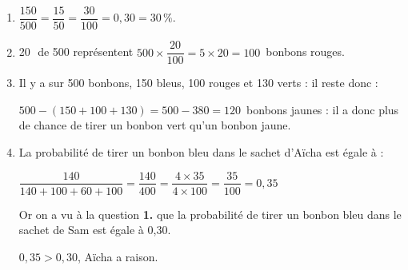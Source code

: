 
\medskip

%
%

\begin{enumerate}
\item %

$\dfrac{150}{500} =  \dfrac{15}{50} = \dfrac{30}{100} = 0,30 = 30\,\%$.
\item %
20\,\ de 500 représentent $500 \times \dfrac{20}{100} = 5 \times 20 = 100$~bonbons rouges.
\item %
Il y a sur 500 bonbons, 150 bleus, 100 rouges et 130 verts : il reste donc :

$500 - (150 + 100 + 130) = 500 - 380 = 120$~bonbons jaunes : il a donc plus de chance de tirer un bonbon vert qu'un bonbon jaune.
\item  %

La probabilité de tirer un bonbon bleu dans le sachet d'Aïcha est égale à :

$\dfrac{140}{140 + 100 + 60 + 100} = \dfrac{140}{400} = \dfrac{4 \times 35}{4 \times 100} = \dfrac{35}{100} = 0,35$



Or on a vu à la question \textbf{1.} que la probabilité de tirer un bonbon bleu dans le sachet de Sam  est égale à 0,30.

$0,35 > 0,30$, Aïcha a raison.


\end{enumerate}

\bigskip


